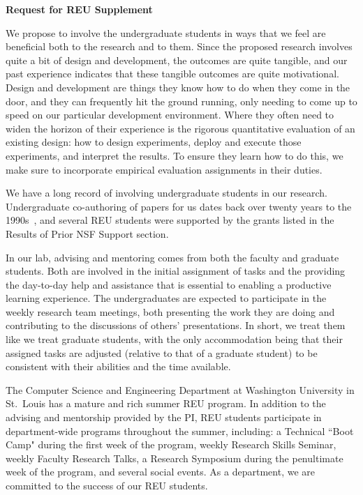 \documentclass[11pt]{article}
\begin{document}
\pagestyle{empty}
\thispagestyle{empty}

\begin{center}
\textbf{\Large Request for REU Supplement}
\end{center}

We propose to involve the undergraduate students in ways that we feel
are beneficial both to the research and to them.  Since the proposed
research involves quite a bit of design and development, the outcomes
are quite tangible, and our past experience indicates that these
tangible outcomes are quite motivational.  Design and development
are things they know how to do when they come in the door, and they
can frequently hit the ground running, only needing to come up to speed
on our particular development environment.
Where they often need to widen the horizon of their experience is the
rigorous quantitative evaluation of an existing design:
how to design experiments, deploy and execute those experiments,
and interpret the results.
To ensure they learn how to do this, we make sure
to incorporate empirical evaluation assignments in their duties.

We have a long record of involving undergraduate students in our research.
Undergraduate co-authoring of papers for us dates back 
over twenty years to the
1990s~\cite{ch94}, and several REU students were supported by the grants
listed in the Results of Prior NSF Support section.

In our lab, advising and mentoring comes from both the faculty and graduate
students. Both are involved in the initial assignment of tasks and
the providing the day-to-day help and assistance that is essential to
enabling a productive learning experience.  The undergraduates are
expected to participate in the weekly research team meetings, both
presenting the work they are doing and contributing to the discussions
of others' presentations.  In short, we treat them like we treat graduate
students, with the only accommodation being that their assigned tasks
are adjusted (relative to that of a graduate student) to be consistent
with their abilities and the time available.

The Computer Science and Engineering Department at Washington University
in St.~Louis has a mature and rich summer REU program. In addition to
the advising and mentorship provided by the PI, REU students participate
in department-wide programs throughout the summer, including:
a Technical ``Boot Camp" during the first week of the program,
weekly Research Skills Seminar, weekly Faculty Research Talks,
a Research Symposium during the penultimate week of the program,
and several social events.
As a department, we are committed to the success of our REU students.
\end{document}
